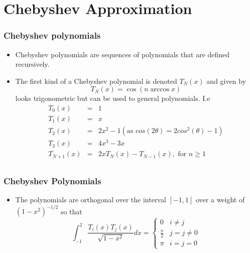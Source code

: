 \documentclass[10pt]{beamer}
\begin{document}
\section{Chebyshev Approximation}

\begin{frame}
  \frametitle{Chebyshev polynomials}
  \begin{itemize}
  \item Chebyshev polynomials are sequences of polynomials that are defined recursively.
  \item The first kind of a Chebyshev polynomial is denoted $T_N(x)$ and given by
    \[
      T_N(x) = \cos( n \arccos x)
    \]
    looks trigonometric but can be used to general polynomials. I.e
    \[
      \begin{array}{rcl}
        T_0(x)     & = & 1\\
        T_1(x)     & = & x\\
        T_2(x)     & = & 2 x^2 - 1 (\mbox{as } cos(2\theta) = 2cos^2(\theta) -1) \\ 
        T_3(x)     & = & 4 x^3 - 3 x \\
        T_{N+1}(x)  & = & 2 x T_N(x) - T_{N-1}(x), \mbox{ for } n \geq 1\\
      \end{array}
    \]
  \end{itemize}
\end{frame}

\begin{frame}
  \frametitle{Chebyshev Polynomials}
  \begin{itemize}
  \item The polynomials are orthogonal over the interval $[-1,1]$ over a weight of $(1-x^2)^{-1/2}$ so that
    \[
      \int_{-1}^2 \frac{T_i(x) T_j(x)}{\sqrt{1-x^2}} dx = \left\{
        \begin{array}{ll}
          0& i \neq j\\
          \frac{\pi}{2} & j = j \neq 0\\
          \pi & i = j = 0
        \end{array}\right.
    \]
  \end{itemize}
\end{frame}
\end{document}
